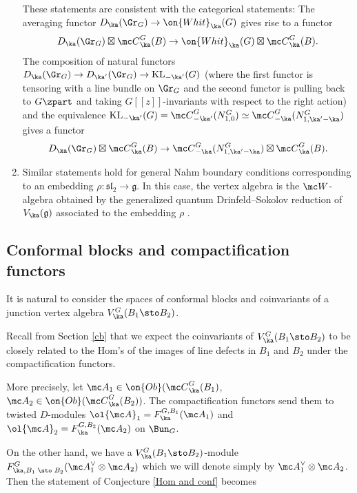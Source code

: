 \documentclass[11pt,reqno]{amsart}
\theoremstyle{plain}
\numberwithin{equation}{section}
\newcommand{\g}{\mathfrak{g}}
\DeclareMathOperator{\KL}{KL}
\theoremstyle{definition}
\begin{document}
\begin{enumerate}
These statements are consistent with the categorical statements: The
averaging functor $D_\ka(\Gr_G) \to \on{Whit}_{\ka}(G)$ gives rise to
a functor
$$
D_\ka(\Gr_G) \boxtimes {\mc C}^G_\ka(B) \to \on{Whit}_{\ka}(G)
\boxtimes {\mc C}^G_\ka(B).
$$
The composition of natural functors $D_\ka(\Gr_G) \to D_{\ka'}(\Gr_G)
\to \KL_{-\ka'}(G)$ (where the first functor is tensoring with a line
bundle on $\Gr_G$ and the second functor is pulling back to $G\zpart$
and taking $G[[z]]$-invariants with respect to the right action) and
the equivalence $\KL_{-\ka'}(G) = {\mc C}^G_{-\ka'}(N^G_{1,0}) \simeq
{\mc C}^G_{-\ka}(N^G_{1,\ka'-\ka})$ gives a functor
$$
D_\ka(\Gr_G) \boxtimes {\mc C}^G_\ka(B) \to {\mc
  C}^G_{-\ka}(N^G_{1,\ka'-\ka}) \boxtimes {\mc C}^G_\ka(B).
$$

\bigskip

\item Similar statements hold for general Nahm boundary conditions
  corresponding to an embedding $\rho: \mathfrak{sl}_2 \to \g$. In
  this case, the vertex algebra is the ${\mc W}$-algebra obtained by
  the generalized quantum Drinfeld--Sokolov reduction of $V_\ka(\g)$
  associated to the embedding $\rho$ \cite{KRW}.
\end{enumerate}

\subsection{Conformal blocks and compactification
  functors}    \label{conf blocks}

It is natural to consider the spaces of conformal blocks and
coinvariants of a junction vertex algebra $V^G_\ka(B_1\sto B_2)$.

Recall from Section \ref{cb} that we expect the coinvariants of
$V^G_\ka(B_1\sto B_2)$ to be closely related to the Hom's of the
images of line defects in $B_1$ and $B_2$ under the compactification
functors.

More precisely, let ${\mc A}_1 \in \on{Ob}({\mc C}^G_\ka(B_1)$, ${\mc
  A}_2 \in \on{Ob}({\mc C}^G_\ka(B_2))$. The compactification functors
send them to twisted $D$-modules $\ol{\mc A}_1 = F^{G,B_1}_\ka({\mc
  A_1})$ and $\ol{\mc A}_2 = F^{G,B_2}_\ka({\mc A_2})$ on $\Bun_G$.

On the other hand, we have a $V^G_\ka(B_1\sto B_2)$-module
$F^G_{\ka,B_1\; \sto \; B_2}({\mc A}_1^\vee \otimes {\mc A}_2)$ which
we will denote simply by ${\mc A}_1^\vee \otimes {\mc A}_2$. Then the
statement of Conjecture \ref{Hom and conf} becomes
\end{document}
